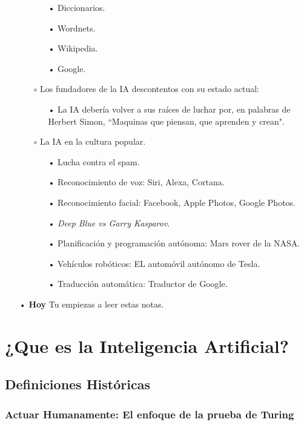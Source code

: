 \documentclass[12pt,a4paper]{book}
\begin{document}
\begin{enumerate}
\begin{enumerate}
  \begin{enumerate}
    \item[•] Diccionarios.
    \item[•] Wordnets.
    \item[•] Wikipedia.
    \item[•] Google.
 \end{enumerate}
 \item[$\circ$] Los fundadores de la IA descontentos con su estado actual:
  \begin{enumerate}
   \item[•] La IA debería volver a sus raíces de luchar por, en palabras de Herbert Simon, ``Maquinas que piensan, que aprenden y crean".
  \end{enumerate}
  \item[$\circ$] La IA en la cultura popular.
   \begin{enumerate}
   \item[•] Lucha contra el spam.
   \item[•] Reconocimiento de voz: Siri, Alexa, Cortana.
   \item[•] Reconocimiento facial: Facebook, Apple Photos, Google Photos.
   \item[•] \textsl{Deep Blue vs Garry Kasparov}.
   \item[•] Planificación y programación autónoma: Mars rover de la NASA.
   \item[•] Vehículos robóticos: EL automóvil autónomo de Tesla.
   \item[•] Traducción automática: Traductor de Google.
   \end{enumerate}  
\end{enumerate}
\item[•] \textbf{Hoy} Tu empiezas a leer estas notas.
\end{enumerate}

\chapter{¿Que es la Inteligencia Artificial?}

  \section{Definiciones Históricas}
  \subsection{Actuar Humanamente: El enfoque de la prueba de Turing}
  
\end{document}
